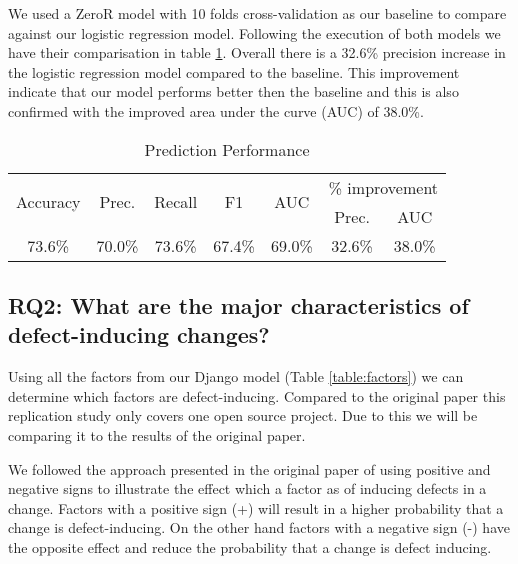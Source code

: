 \documentclass[10pt, conference]{IEEEtran}
\begin{document}
We used a ZeroR model with 10 folds cross-validation as our baseline to compare against our logistic regression model. Following the execution of both models we have their comparisation in table \ref{table:prediction}. Overall there is a 32.6\% precision increase in the logistic regression model compared to the baseline. This improvement indicate that our model performs better then the baseline and this is also confirmed with the improved area under the curve (AUC) of 38.0\%.  

\begin{table}
	\centering
	\caption{Prediction Performance}
	\begin{tabular}{|c|c|c|c|c||c|c|}
		\hline \multirow{2}{*}{Accuracy} & \multirow{2}{*}{Prec.} & \multirow{2}{*}{Recall} & \multirow{2}{*}{F1} & \multirow{2}{*}{AUC} & \multicolumn{2}{|c|}{\% improvement} \\ \cline{6-7} 
		 &  &  &  &  & Prec. & AUC \\  
		\hline 73.6\% & 70.0\% & 73.6\% & 67.4\% & 69.0\% & 32.6\% & 38.0\% \\ 
		\hline 
	\end{tabular}
	
	\label{table:prediction} 
\end{table}


\subsection{RQ2: What are the major characteristics of defect-inducing changes?}
\label{sec:rq2}

Using all the factors from our Django model (Table \ref{table:factors}) we can determine which factors are defect-inducing. Compared to the original paper this replication study only covers one open source project. Due to this we will be comparing it to the results of the original paper. 

We followed the approach presented in the original paper of using positive and negative signs to illustrate the effect which a factor as of inducing defects in a change. Factors with a positive sign (+) will result in a higher probability that a change is defect-inducing. On the other hand factors with a negative sign (-) have the opposite effect and reduce the probability that a change is defect inducing.  
\end{document}
